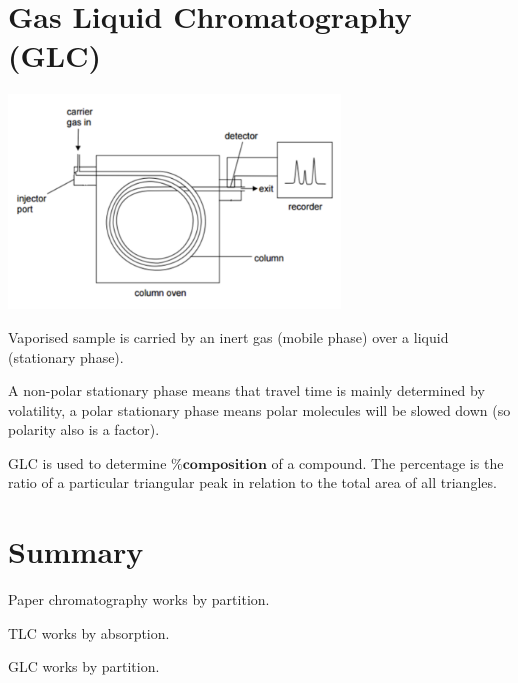 \documentclass{article}
\theoremstyle{mytheoremstyle}
\theoremstyle{mytheoremstyle}
\theoremstyle{myproblemstyle}
\begin{document}
    \section{Gas Liquid Chromatography (GLC)}
    \begin{center}
        \includegraphics[width=250pt]{Capture-2025-08-26-104432.png}
    \end{center}

    Vaporised sample is carried by an inert gas (mobile phase) over a liquid (stationary phase).

    A non-polar stationary phase means that travel time is mainly determined by volatility, a polar stationary phase means polar molecules will be slowed down (so polarity also is a factor).
    
    GLC is used to determine $\textbf{\% composition}$ of a compound. The percentage is the ratio of a particular triangular peak in relation to the total area of all triangles.

    \section{Summary}
    Paper chromatography works by partition.

    TLC works by absorption.
    
    GLC works by partition.
    
\end{document}

